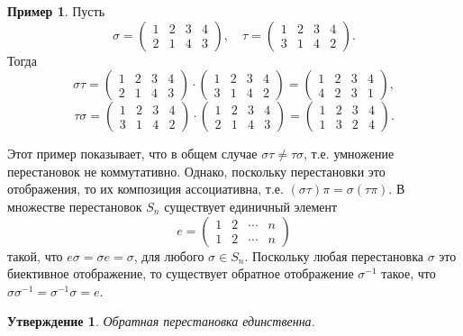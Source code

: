 \documentclass[12pt, titlepage, oneside]{amsbook}
\newtheorem{claim}[theorem]{Утверждение}
\theoremstyle{definition}
\newtheorem{example}[theorem]{Пример}
\theoremstyle{remark}
\begin{document}
\begin{example}
	Пусть
	$$\sigma=\begin{pmatrix} 1 & 2 & 3 & 4 \\
                2 & 1 & 4 & 3\end{pmatrix},\quad\tau=\begin{pmatrix} 1 & 2 & 3 & 4 \\
                3 & 1 & 4 & 2\end{pmatrix}.$$ Тогда $$\sigma\tau=\begin{pmatrix} 1 & 2 & 3 & 4 \\
                2 & 1 & 4 & 3\end{pmatrix}\cdot\begin{pmatrix} 1 & 2 & 3 & 4 \\
                3 & 1 & 4 & 2\end{pmatrix}=\begin{pmatrix} 1 & 2 & 3 & 4 \\
                4 & 2 & 3 & 1\end{pmatrix},$$
	$$\tau\sigma=\begin{pmatrix} 1 & 2 & 3 & 4 \\
                3 & 1 & 4 & 2\end{pmatrix}\cdot \begin{pmatrix} 1 & 2 & 3 & 4 \\
                2 & 1 & 4 & 3\end{pmatrix}=\begin{pmatrix} 1 & 2 & 3 & 4 \\
                1 & 3 & 2 & 4\end{pmatrix}.$$
\end{example}
Этот пример показывает, что в общем случае $\sigma\tau\neq\tau\sigma$, т.е. умножение перестановок не коммутативно. Однако, поскольку перестановки это отображения, то их композиция ассоциативна, т.е. $(\sigma\tau)\pi=\sigma(\tau\pi)$. В множестве перестановок $S_n$ существует единичный элемент $$e=\begin{pmatrix} 1 & 2 & \cdots & n \\
                1 & 2 & \cdots & n\end{pmatrix}$$ такой, что $e\sigma=\sigma e=\sigma$, для любого $\sigma\in S_n$. Поскольку любая перестановка $\sigma$ это биективное отображение, то существует обратное отображение $\sigma^{-1}$ такое, что $\sigma\sigma^{-1}=\sigma^{-1}\sigma=e$.

\begin{claim}
	\label{Pod1}
	Обратная перестановка единственна.
\end{claim}
\end{document}
